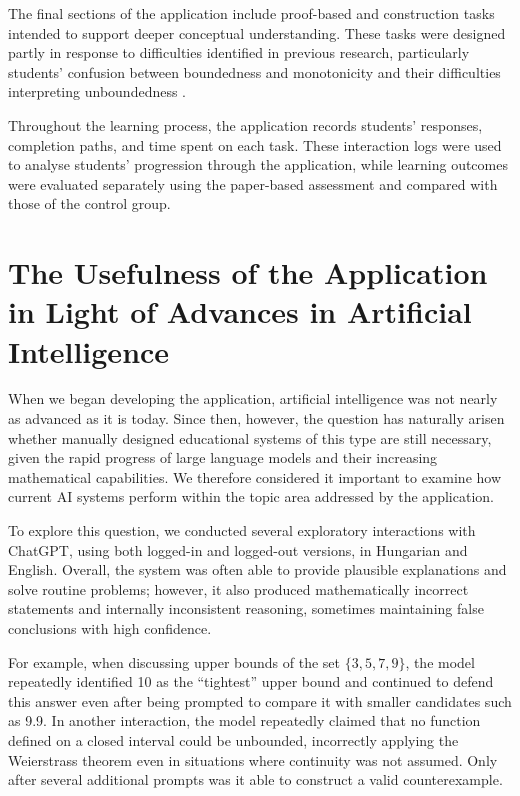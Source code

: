 \documentclass[11pt]{article}
\begin{document}
The final sections of the application include proof-based and construction tasks intended to support deeper conceptual understanding. These tasks were designed partly in response to difficulties identified in previous research, particularly students' confusion between boundedness and monotonicity and their difficulties interpreting unboundedness \citep{Bloch2003}.

Throughout the learning process, the application records students' responses, completion paths, and time spent on each task. These interaction logs were used to analyse students' progression through the application, while learning outcomes were evaluated separately using the paper-based assessment and compared with those of the control group.
\section{The Usefulness of the Application in Light of Advances in Artificial Intelligence}

When we began developing the application, artificial intelligence was not nearly as advanced as it is today. Since then, however, the question has naturally arisen whether manually designed educational systems of this type are still necessary, given the rapid progress of large language models and their increasing mathematical capabilities. We therefore considered it important to examine how current AI systems perform within the topic area addressed by the application.

To explore this question, we conducted several exploratory interactions with ChatGPT, using both logged-in and logged-out versions, in Hungarian and English. Overall, the system was often able to provide plausible explanations and solve routine problems; however, it also produced mathematically incorrect statements and internally inconsistent reasoning, sometimes maintaining false conclusions with high confidence.

For example, when discussing upper bounds of the set $\{3,5,7,9\}$, the model repeatedly identified 10 as the ``tightest'' upper bound and continued to defend this answer even after being prompted to compare it with smaller candidates such as 9.9. In another interaction, the model repeatedly claimed that no function defined on a closed interval could be unbounded, incorrectly applying the Weierstrass theorem even in situations where continuity was not assumed. Only after several additional prompts was it able to construct a valid counterexample.
\end{document}
